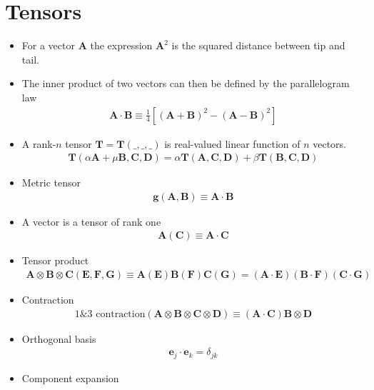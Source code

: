 \documentclass[10pt,a4paper]{book}
\theoremstyle{definition}
\begin{document}
\section{Tensors}
\begin{itemize}
\item For a vector $\mathbf{A}$ the expression $\mathbf{A}^2$ is the squared distance between tip and tail.
\item The inner product of two vectors can then be defined by the parallelogram law
\begin{align}
    \mathbf{A}\cdot\mathbf{B}\equiv\frac{1}{4}\left[(\mathbf{A}+\mathbf{B})^2-(\mathbf{A}-\mathbf{B})^2\right]
\end{align}
\item A rank-$n$ tensor $\mathbf{T}=\mathbf{T}(\_,\_,\_)$ is real-valued linear function of $n$ vectors.
\begin{align}
    \mathbf{T}(\alpha\mathbf{A}+\mu\mathbf{B},\mathbf{C},\mathbf{D})=\alpha\mathbf{T}(\mathbf{A},\mathbf{C},\mathbf{D})+\beta\mathbf{T}(\mathbf{B},\mathbf{C},\mathbf{D})
\end{align}
\item Metric tensor
\begin{align}
    \mathbf{g}(\mathbf{A},\mathbf{B})\equiv\mathbf{A}\cdot\mathbf{B}
\end{align}
\item A vector is a tensor of rank one 
\begin{align}
    \mathbf{A}(\mathbf{C})\equiv\mathbf{A}\cdot\mathbf{C}
\end{align}
\item Tensor product 
\begin{align}
    \mathbf{A}\otimes\mathbf{B}\otimes\mathbf{C}(\mathbf{E},\mathbf{F},\mathbf{G})\equiv\mathbf{A}(\mathbf{E})\mathbf{B}(\mathbf{F})\mathbf{C}(\mathbf{G})=(\mathbf{A}\cdot\mathbf{E})(\mathbf{B}\cdot\mathbf{F})(\mathbf{C}\cdot\mathbf{G})
\end{align}
\item Contraction
\begin{align}
    \text{1\&3 contraction}(\mathbf{A}\otimes\mathbf{B}\otimes\mathbf{C}\otimes\mathbf{D})\equiv(\mathbf{A}\cdot\mathbf{C})\mathbf{B}\otimes\mathbf{D}
\end{align}
\item Orthogonal basis
\begin{align}
    \mathbf{e}_j\cdot\mathbf{e}_k=\delta_{jk}
\end{align}
\item Component expansion

\end{itemize}
\end{document}
